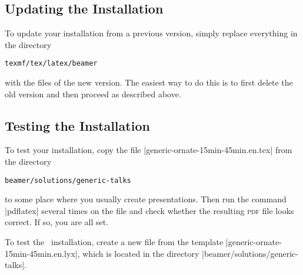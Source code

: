 \subsection{Updating the Installation}

To update your installation from a previous version, simply replace
everything in the directory
\begin{verbatim}
texmf/tex/latex/beamer
\end{verbatim}
with the files of the new version. The easiest way to do this is to
first delete the old version and then proceed as described above.


\subsection{Testing the Installation}

To test your installation, copy the file
|generic-ornate-15min-45min.en.tex| from the directory
\begin{verbatim}
beamer/solutions/generic-talks
\end{verbatim}
to some place where you usually
create presentations. Then run the command |pdflatex| several times on
the file and check whether the resulting \textsc{pdf} file looks
correct. If so, you are all set.

\lyxnote
To test the \LyX\ installation, create a new file from the
template |generic-ornate-15min-45min.en.lyx|, which is located in the directory
|beamer/solutions/generic-talks|.




